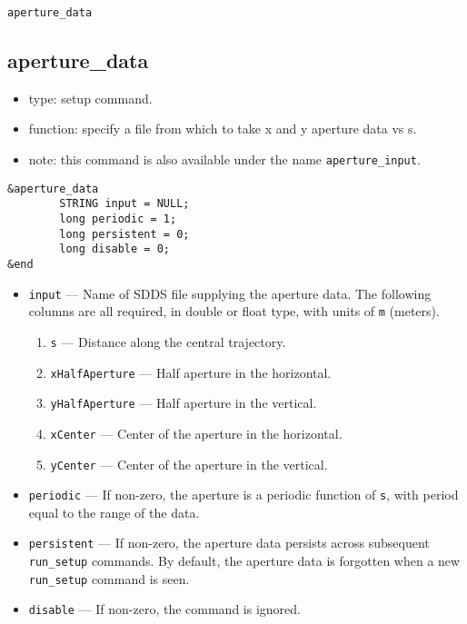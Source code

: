 \documentclass[11pt]{article}
\begin{document}
\newpage
\begin{center}{\Large\verb|aperture_data|}\end{center}
\subsection{aperture\_data \label{subsec:aperturedata}}

\begin{itemize}
\item type: setup command.
\item function: specify a file from which to take x and y aperture data vs s.
\item note: this command is also available under the name \verb|aperture_input|.
\end{itemize}

\begin{verbatim}
&aperture_data
        STRING input = NULL;
        long periodic = 1; 
        long persistent = 0;
        long disable = 0;
&end
\end{verbatim}

\begin{itemize}
\item \verb|input| --- Name of SDDS file supplying the aperture data.  The following columns are
  all required, in double or float type, with units of \verb|m| (meters).
  \begin{enumerate}
    \item \verb|s| --- Distance along the central trajectory.  
    \item \verb|xHalfAperture| --- Half aperture in the horizontal. 
    \item \verb|yHalfAperture| --- Half aperture in the vertical.
    \item \verb|xCenter| --- Center of the aperture in the horizontal.
    \item \verb|yCenter| --- Center of the aperture in the vertical.
  \end{enumerate}
\item \verb|periodic| --- If non-zero, the aperture is a periodic function of \verb|s|, with period equal
  to the range of the data.
\item \verb|persistent| --- If non-zero, the aperture data persists across subsequent \verb|run_setup| commands.
  By default, the aperture data is forgotten when a new \verb|run_setup| command is seen.
\item \verb|disable| --- If non-zero, the command is ignored.
\end{itemize}
\end{document}
